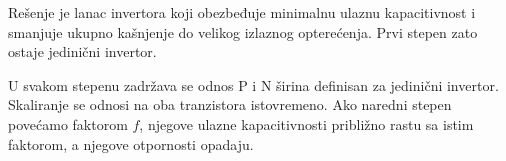 Rešenje je lanac invertora koji obezbeđuje minimalnu ulaznu kapacitivnost i smanjuje ukupno kašnjenje do velikog izlaznog opterećenja. Prvi stepen zato ostaje jedinični invertor.

U svakom stepenu zadržava se odnos P i N širina definisan za jedinični invertor. Skaliranje se odnosi na oba tranzistora istovremeno. Ako naredni stepen povećamo faktorom $f$, njegove ulazne kapacitivnosti približno rastu sa istim faktorom, a njegove otpornosti opadaju.

